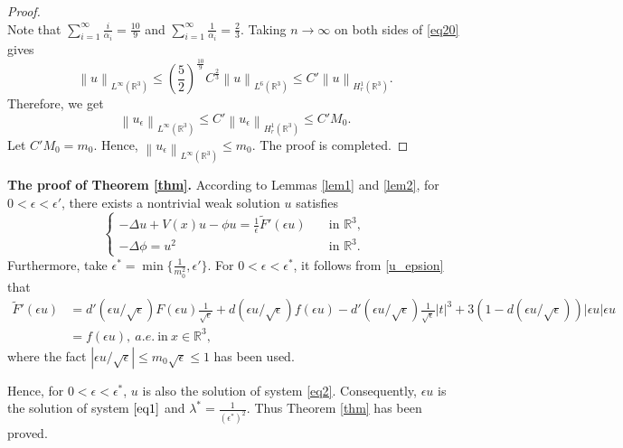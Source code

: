 \documentclass[12pt]{amsart}
\numberwithin{equation}{section}
\theoremstyle{definition}
\begin{document}
\begin{proof}
\begin{equation}
		\end{equation}
		Note that $\sum_{i=1}^{\infty }\frac{i}{\alpha _{i}}=\frac{10}{9}$ and $\sum_{i=1}^{\infty }\frac{1}{\alpha _{i}}=\frac{2}{3}$.
		Taking $n\to \infty $ on both sides of \eqref{eq20} gives
		\begin{equation*}
			\left\|u \right\|_{L^{\infty}(\mathbb{R}^3) }\leq \left ( \frac{5}{2} \right )^{\frac{10}{9}} C^{\frac{2}{3}}\left\|u \right\|_{L^{6}(\mathbb{R}^3)}\leq C' \left\|u \right\|_{H_{r}^{1}(\mathbb{R}^3)}.
		\end{equation*}
		Therefore, we get
		\begin{equation*}
			\left\| u_{\epsilon }\right\|_{L^{\infty}(\mathbb{R}^3) }\leq C' \left\|u_{\epsilon} \right\|_{H_{r}^{1}(\mathbb{R}^3)}\leq C' M_{0}.
		\end{equation*}
		Let $C'M_{0}=m_0$. Hence, $\left\|u_{\epsilon} \right\|_{L^{\infty}(\mathbb{R}^3)}\leq m_0$.
The proof is completed.
	\end{proof}
{\bf The proof of Theorem \ref{thm}.}
According to Lemmas \ref{lem1} and \ref{lem2}, for $0<\epsilon<\epsilon'$, there exists a nontrivial weak solution $u$ satisfies
\begin{equation*}
	\begin{cases}
		-\Delta u+V(x) u-\phi u=\frac{1}{\epsilon}\tilde F'(\epsilon u) &\quad\text{in }\mathbb R^3,\\
		-\Delta\phi= u^2 &\quad\text{in }\mathbb R^3.
	\end{cases}
\end{equation*}
Furthermore, take $\epsilon^{*}=\min\{\frac{1}{m_{0}^{2}},\epsilon'\}$. For $0<\epsilon<\epsilon^{*}$, it follows from \eqref{u_epsion} that
	\begin{equation*}
	\begin{split}
\tilde F'(\epsilon u)&=d'(\epsilon u/\sqrt{\epsilon}) F(\epsilon u)\frac{1}{\sqrt{\epsilon}}+d(\epsilon u/\sqrt{\epsilon})f(\epsilon u)-d'(\epsilon u/\sqrt{\epsilon})\frac{1}{\sqrt{\epsilon}}|t|^3+3(1-d(\epsilon u/\sqrt{\epsilon}))|\epsilon u|\epsilon u\\
&=f(\epsilon u),~a.e.~\text{in}~x\in\mathbb{R}^3,
	\end{split}\end{equation*}
where the fact $|\epsilon u/\sqrt{\epsilon}|\leq m_0\sqrt{\epsilon}\leq 1$ has been used.	

Hence, for $0<\epsilon<\epsilon^{*}$, $u$ is also the solution of system \eqref{eq2}. Consequently, $\epsilon u$ is the solution of system $\eqref{eq1}$ and $\lambda^*=\frac{1}{(\epsilon^*)^{2}}$. Thus Theorem \ref{thm} has been proved.
\end{document}
